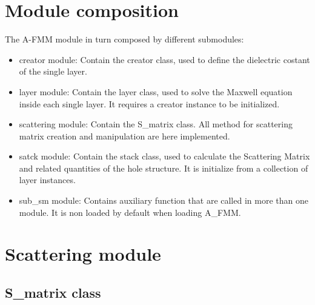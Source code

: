 \documentclass[a4paper,10pt]{report}
\begin{document}
\section{Module composition}
The A-FMM module in turn composed by different submodules:
\begin{itemize}
\item creator module: Contain the creator class, used to define the dielectric costant of the single layer.   
\item layer module: Contain the layer class, used to solve the Maxwell equation inside each single layer. It requires a creator instance to be initialized.
\item scattering module: Contain the S\_matrix class. All method for scattering matrix creation and manipulation are here implemented.  
\item satck module: Contain the stack class, used to calculate the Scattering Matrix and related quantities of the hole structure. It is initialize from a collection of layer instances.
\item sub\_sm module: Contains auxiliary function that are called in more than one module. It is non loaded by default when loading A\_FMM.
\end{itemize}

\section{Scattering module}
\subsection{S\_matrix class}
\end{document}
